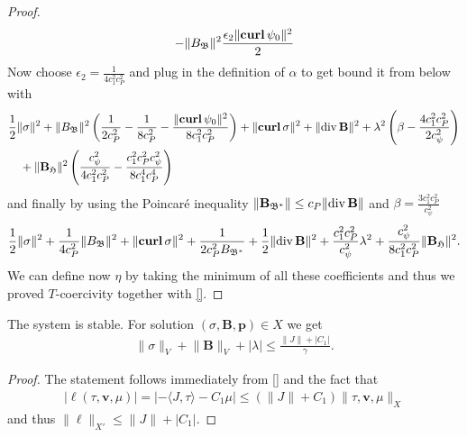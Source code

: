 \documentclass[../master_thesis.tex]{subfiles}
\begin{document}
\begin{proof}
\begin{align*}
        - \lVert B_\mathfrak{B} \rVert^2 \frac{ \epsilon_2 \lVert  \veccurl \psi_0 \rVert^2 }{2}
    \end{align*}
    Now choose $\epsilon_2 = \frac{1}{4 c_1^2 c_P^2}$ and plug in the definition of $\alpha$
    to get bound it from below with
    \begin{align*}
        &\frac{1}{2} \lVert \sigma \rVert^2 + \lVert B_\mathfrak{B} \rVert^2 
        \left( \frac{1}{2 c_P^2} - \frac{1}{8 c_P^2} 
        - \frac{\lVert  \veccurl \psi_0 \rVert^2}{8 c_1^2 c_P^2} \right)
        + \lVert  \veccurl \sigma \rVert^2 + \lVert \diver \mathbf{B} \rVert ^2
        + \lambda ^2 \left( \beta - \frac{4 c_1^2 c_P^2}{2 c_\psi^2} \right)
        \\ &\quad+ \lVert \mathbf{B}_\mathfrak{H} \rVert^2  \left( \frac{c_\psi^2}{4 c_1^2 c_P^2 }
        - \frac{ c_1^2 c_P^2 c_\psi^2}{8 c_1^4 c_P^4} \right)
    \end{align*}
    and finally by using the Poincaré inequality $\lVert \mathbf{B}_{\mathfrak{B}^*} \rVert 
    \leq c_P \lVert \diver \mathbf{B} \rVert$
    and $\beta = \frac{3 c_1^2 c_P^2}{c_\psi^2}$
    \begin{align*}
        \frac{1}{2} \lVert \sigma \rVert^2 + \frac{1}{4 c_P^2}\lVert B_\mathfrak{B} \rVert^2 
        + \lVert  \veccurl \sigma \rVert^2
        + \frac{1}{2 c_P^2 B_{\mathfrak{B}^*}} 
        + \frac{1}{2} \lVert \diver \mathbf{B} \rVert ^2
        + \frac{c_1^2 c_P^2}{c_\psi^2}\lambda^2
        + \frac{c_\psi^2}{8 c_1^2 c_P^2} \lVert \mathbf{B}_\mathfrak{H} \rVert^2.
    \end{align*}
    We can define now $\eta$ by taking the minimum of all these coefficients and 
    thus we proved $T$-coercivity together with \ref{}. 
\end{proof}

\begin{theorem}[Stability]
    The system is stable. For solution $(\sigma, \mathbf{B},\mathbf{p}) \in X$
    we get 
    \begin{align*}
        \lVert \sigma \rVert _V + \lVert \mathbf{B} \rVert _V + |\lambda|
        \leq \frac{\lVert J \rVert + |C_1|}{\gamma}.
    \end{align*}
\end{theorem}
\begin{proof}
    The statement follows immediately from \ref{} and the fact that 
    \begin{align*}
        | \ell(\tau,\mathbf{v},\mu) |
        = | - \langle J, \tau \rangle - C_1 \mu | 
        \leq (\lVert J \rVert + C_1) \lVert \tau,\mathbf{v},\mu \rVert _X
    \end{align*}
    and thus $\lVert \ell \rVert _{X'} \leq \lVert J \rVert + | C_1 |$.
\end{proof}
\end{document}
